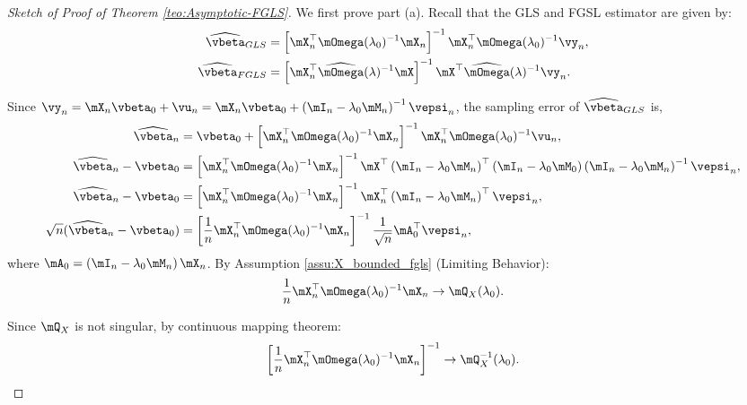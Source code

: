 \begin{proof}[Sketch of Proof of Theorem \ref{teo:Asymptotic-FGLS}]
We first prove part (a). Recall that the GLS and FGSL estimator are given by:
\begin{equation*}
\begin{aligned}
\widehat{\vbeta}_{GLS} & = \left[\mX^\top_n\mOmega(\lambda_0)^{-1}\mX_n\right]^{-1}\mX^\top_n\mOmega(\lambda_0)^{-1}\vy_n,  \\
\widehat{\vbeta}_{FGLS} & = \left[\mX^\top_n\widehat{\mOmega}(\lambda)^{-1}\mX\right]^{-1}\mX^\top\widehat{\mOmega}(\lambda)^{-1}\vy_n.
\end{aligned}
\end{equation*}

Since $\vy_n = \mX_n\vbeta_0 + \vu_n = \mX_n\vbeta_0 + \left(\mI_n-\lambda_0\mM_n\right)^{-1}\vepsi_n$, the sampling error of $\widehat{\vbeta}_{GLS}$ is,
\begin{equation*}
  \begin{aligned}
  \widehat{\vbeta}_n & = \vbeta_0 + \left[\mX^\top_n\mOmega(\lambda_0)^{-1}\mX_n\right]^{-1}\mX^\top_n\mOmega(\lambda_0)^{-1}\vu_n,  \\
  \widehat{\vbeta}_n - \vbeta_0 & =  \left[\mX^\top_n\mOmega(\lambda_0)^{-1}\mX_n\right]^{-1}\mX^\top\left(\mI_n - \lambda_0\mM_n\right)^\top\left(\mI_n - \lambda_0\mM_0\right)\left(\mI_n - \lambda_0\mM_n\right)^{-1}\vepsi_n, \\
  \widehat{\vbeta}_n - \vbeta_0 & =  \left[\mX^\top_n\mOmega(\lambda_0)^{-1}\mX_n\right]^{-1}\mX^\top_n\left(\mI_n - \lambda_0\mM_n\right)^\top\vepsi_n,  \\
  \sqrt{n}(\widehat{\vbeta}_n - \vbeta_0) & =  \left[\frac{1}{n}\mX^\top_n\mOmega(\lambda_0)^{-1}\mX_n\right]^{-1}\frac{1}{\sqrt{n}}\mA^\top_0\vepsi_n, 
  \end{aligned}
\end{equation*}
%
where $\mA_0 = \left(\mI_n - \lambda_0\mM_n\right)\mX_n$. By Assumption \ref{assu:X_bounded_fgls} (Limiting Behavior): 
\begin{equation*}
  \frac{1}{n}\mX^\top_n\mOmega(\lambda_0)^{-1}\mX_n \to \mQ_X(\lambda_0).
\end{equation*}

Since $\mQ_X$ is not singular, by continuous mapping theorem:
\begin{equation*}
  \left[\frac{1}{n}\mX^\top_n\mOmega(\lambda_0)^{-1}\mX_n\right]^{-1} \to \mQ_X^{-1}(\lambda_0).
\end{equation*}


\end{proof}
